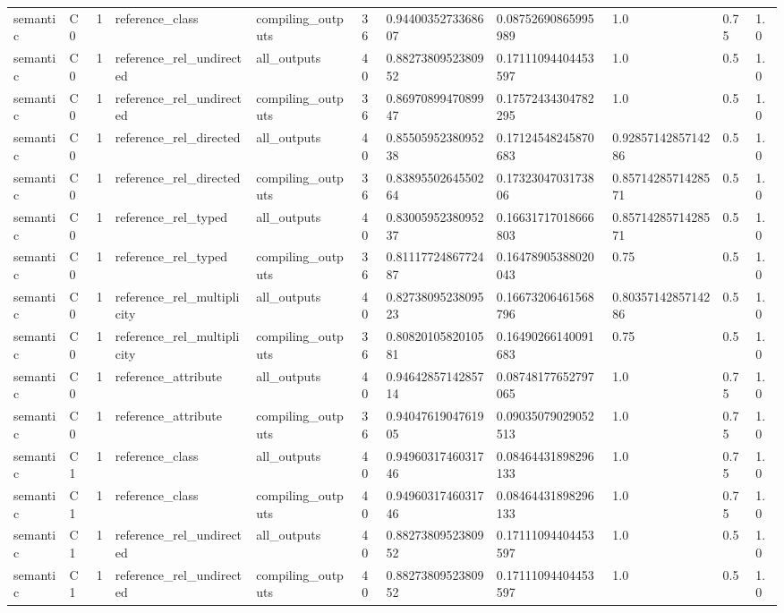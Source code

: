 \begin{tabular}{lllllllllll}
semantic & C0 & 1 & reference\_class & compiling\_outputs & 36 & 0.9440035273368607 & 0.08752690865995989 & 1.0 & 0.75 & 1.0 \\
semantic & C0 & 1 & reference\_rel\_undirected & all\_outputs & 40 & 0.8827380952380952 & 0.17111094404453597 & 1.0 & 0.5 & 1.0 \\
semantic & C0 & 1 & reference\_rel\_undirected & compiling\_outputs & 36 & 0.8697089947089947 & 0.17572434304782295 & 1.0 & 0.5 & 1.0 \\
semantic & C0 & 1 & reference\_rel\_directed & all\_outputs & 40 & 0.8550595238095238 & 0.17124548245870683 & 0.9285714285714286 & 0.5 & 1.0 \\
semantic & C0 & 1 & reference\_rel\_directed & compiling\_outputs & 36 & 0.8389550264550264 & 0.1732304703173806 & 0.8571428571428571 & 0.5 & 1.0 \\
semantic & C0 & 1 & reference\_rel\_typed & all\_outputs & 40 & 0.8300595238095237 & 0.16631717018666803 & 0.8571428571428571 & 0.5 & 1.0 \\
semantic & C0 & 1 & reference\_rel\_typed & compiling\_outputs & 36 & 0.8111772486772487 & 0.16478905388020043 & 0.75 & 0.5 & 1.0 \\
semantic & C0 & 1 & reference\_rel\_multiplicity & all\_outputs & 40 & 0.8273809523809523 & 0.16673206461568796 & 0.8035714285714286 & 0.5 & 1.0 \\
semantic & C0 & 1 & reference\_rel\_multiplicity & compiling\_outputs & 36 & 0.8082010582010581 & 0.16490266140091683 & 0.75 & 0.5 & 1.0 \\
semantic & C0 & 1 & reference\_attribute & all\_outputs & 40 & 0.9464285714285714 & 0.08748177652797065 & 1.0 & 0.75 & 1.0 \\
semantic & C0 & 1 & reference\_attribute & compiling\_outputs & 36 & 0.9404761904761905 & 0.09035079029052513 & 1.0 & 0.75 & 1.0 \\
semantic & C1 & 1 & reference\_class & all\_outputs & 40 & 0.9496031746031746 & 0.08464431898296133 & 1.0 & 0.75 & 1.0 \\
semantic & C1 & 1 & reference\_class & compiling\_outputs & 40 & 0.9496031746031746 & 0.08464431898296133 & 1.0 & 0.75 & 1.0 \\
semantic & C1 & 1 & reference\_rel\_undirected & all\_outputs & 40 & 0.8827380952380952 & 0.17111094404453597 & 1.0 & 0.5 & 1.0 \\
semantic & C1 & 1 & reference\_rel\_undirected & compiling\_outputs & 40 & 0.8827380952380952 & 0.17111094404453597 & 1.0 & 0.5 & 1.0 \\

\end{tabular}

